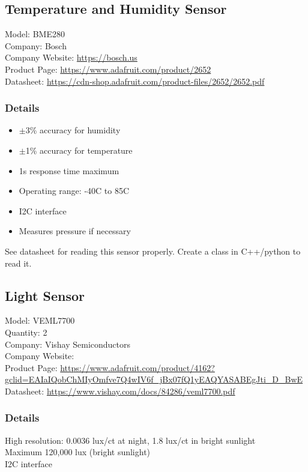 \subsection{Temperature and Humidity Sensor}
Model: BME280 \\
Company: Bosch \\
Company Website: \href{https://bosch.us/}{https://bosch.us} \\
Product Page: \href{https://www.adafruit.com/product/2652}{https://www.adafruit.com/product/2652} \\
Datasheet: \href{https://cdn-shop.adafruit.com/product-files/2652/2652.pdf}{https://cdn-shop.adafruit.com/product-files/2652/2652.pdf}

\subsubsection{Details}
\begin{itemize}
	\item $ \pm $3\% accuracy for humidity
	\item $ \pm $1\% accuracy for temperature
	\item 1s response time maximum
	\item Operating range: -40C to 85C
	\item I2C interface
	\item Measures pressure if necessary
\end{itemize}

See datasheet for reading this sensor properly. Create a class in C++/python to read it.

\subsection{Light Sensor}

Model: VEML7700 \\
Quantity: 2 \\
Company: Vishay Semiconductors \\
Company Website: \\
Product Page: \href{https://www.adafruit.com/product/4162?gclid=EAIaIQobChMIyOmfve7Q4wIV6f_jBx07fQ1yEAQYASABEgJti_D_BwE}{https://www.adafruit.com/product/4162?gclid=EAIaIQobChMIyOmfve7Q4wIV6f\_jBx07fQ1yEAQYASABEgJti\_D\_BwE} \\
Datasheet: \href{https://www.vishay.com/docs/84286/veml7700.pdf}{https://www.vishay.com/docs/84286/veml7700.pdf} \\ 

\subsubsection{Details}
High resolution: 0.0036 lux/ct at night, 1.8 lux/ct in bright sunlight \\
Maximum 120,000 lux (bright sunlight) \\
I2C interface \\

